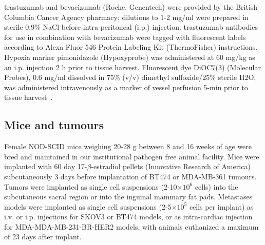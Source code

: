 trastuzumab and bevacizumab (Roche, Genentech) were provided by the British Columbia Cancer Agency pharmacy; dilutions to 1-2 mg/ml were prepared in sterile 0.9\% NaCl before intra-peritoneal (\acs{i.p.}) injection.
trastuzumab antibodies for use in combination with bevacizumab were tagged with fluorescent labels according to Alexa Fluor 546 Protein Labeling Kit (ThermoFisher) instructions.
Hypoxia marker pimonidazole (Hypoxyprobe) was administered at 60 mg/kg as an \acs{i.p.} injection 2 h prior to tissue harvest.
Fluorescent dye DiOC7(3) (Molecular Probes), 0.6 mg/ml dissolved in 75\% (v/v) dimethyl sulfoxide/25\% sterile H2O, was administered intravenously as a marker of vessel perfusion 5-min prior to tissue harvest~\cite{Trotter:1989cs}.

\subsection{Mice and tumours}

Female NOD-SCID mice weighing 20-28 g between 8 and 16 weeks of age were bred and maintained in our institutional pathogen free animal facility.
Mice were implanted with 60 day 17-$\beta$-estradiol pellets (Innovative Research of America) subcutaneously 3 days before implantation of \acs{BT474} or \acs{MDA-MB-361} tumours.
Tumors were implanted as single cell suspensions (2-10$\times 10^6$ cells) into the subcutaneous sacral region or into the inguinal mammary fat pads.
Metastases models were implanted as single cell suspensions (2-5$\times 10^5$ cells per implant) as \acs{i.v.} or \acs{i.p.} injections for SKOV3 or \acs{BT474} models, or as intra-cardiac injection for MDA-MDA-MB-231-BR-\acs{HER2} models, with animals euthanized a maximum of 23 days after implant.

